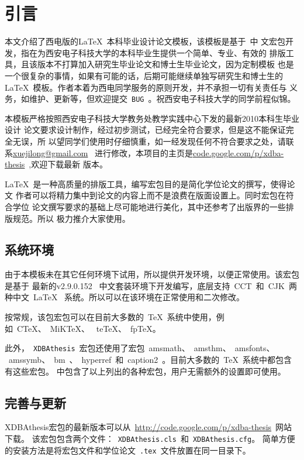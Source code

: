 
\chapter{引言}
\label{chap:introduction}

本文介绍了西电版的\LaTeX{}~本科毕业设计论文模板，该模板是基于\CTeX{}~中
文宏包开发，指在为西安电子科技大学的本科毕业生提供一个简单、专业、有效的
排版工具，且该版本不打算加入研究生毕业论文和博士生毕业论文，因为定制模板
也是一个很复杂的事情，如果有可能的话，后期可能继续单独写研究生和博士生的
\LaTeX{}~模板。作者本着为西电同学服务的原则开发，并不承担一切有关责任与
义务，如维护、更新等，但欢迎提交~\texttt{BUG}~。祝西安电子科技大学的同学前程似锦。

本模板严格按照西安电子科技大学教务处教学实践中心下发的最新2010本科生毕业设计
论文要求设计制作，经过初步测试，已经完全符合要求，但是这不能保证完全无误，所
以望同学们使用时仔细慎重，如一经发现任何不符合要求之处，请联系\href{mailto:xuejilong@gmail.com}{xuejilong@gmail.com}
~进行修改，本项目的主页是\href{code.google.com/p/xdba-thesis}{code.google.com/p/xdba-thesis}~,欢迎下载最新
 版本。

\LaTeX{}~是一种高质量的排版工具，编写宏包目的是简化学位论文的撰写，使得论文
作者可以将精力集中到论文的内容上而不是浪费在版面设置上。同时宏包在符合学位
论文撰写要求的基础上尽可能地进行美化，其中还参考了出版界的一些排版规范。所以
极力推介大家使用。

\section{系统环境}
由于本模板未在其它任何环境下试用，所以提供开发环境，以便正常使用。该宏包是基于
最新的\CTeX v2.9.0.152~ 中文套装\cite{site:ctex}环境下开发编写，底层支持~CCT~和\allowbreak~CJK~两种中文~\LaTeX{}~
系统。所以可以在该环境在正常使用和二次修改。

按常规，该包宏包可以在目前大多数的~\TeX{}~系统中使用，例如~C\TeX{}、~MiK\TeX{}、
~te\TeX{}、~fp\TeX{}。

此外，~\texttt{XDBAthesis}~宏包还使用了宏包~amsmath、~amsthm、~amsfonts、
~amssymb、~bm~、~hyperref~和~caption2~。目前大多数的~\TeX{}~系统中都包含有这些宏包。
中包含了以上列出的各种宏包，用户无需额外的设置即可使用。

\section{完善与更新}

XDBAthesis宏包的最新版本可以从~\url{http://code.google.com/p/xdba-thesis}~网站下载。
该宏包包含两个文件：~\texttt{XDBAthesis.cls}~和~\texttt{XDBAthesis.cfg}。
简单方便的安装方法是将宏包文件和学位论文~\texttt{.tex}~文件放置在同一目录下。

